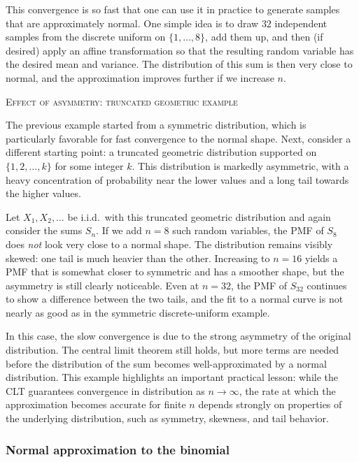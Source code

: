 This convergence is so fast that one can use it in practice to generate samples that are approximately normal.  
One simple idea is to draw \(32\) independent samples from the discrete uniform on \(\{1,\ldots,8\}\), add them up, and then (if desired) apply an affine transformation so that the resulting random variable has the desired mean and variance.  
The distribution of this sum is then very close to normal, and the approximation improves further if we increase \(n\).

\bigskip
\textsc{Effect of asymmetry: truncated geometric example}

The previous example started from a symmetric distribution, which is particularly favorable for fast convergence to the normal shape.  
Next, consider a different starting point: a truncated geometric distribution supported on \(\{1,2,\ldots,k\}\) for some integer \(k\).  
This distribution is markedly asymmetric, with a heavy concentration of probability near the lower values and a long tail towards the higher values.

Let \(X_1, X_2, \ldots\) be i.i.d.\ with this truncated geometric distribution and again consider the sums \(S_n\).  
If we add \(n = 8\) such random variables, the PMF of \(S_8\) does \textit{not} look very close to a normal shape.  
The distribution remains visibly skewed: one tail is much heavier than the other.  
Increasing to \(n = 16\) yields a PMF that is somewhat closer to symmetric and has a smoother shape, but the asymmetry is still clearly noticeable.  
Even at \(n = 32\), the PMF of \(S_{32}\) continues to show a difference between the two tails, and the fit to a normal curve is not nearly as good as in the symmetric discrete-uniform example.

In this case, the slow convergence is due to the strong asymmetry of the original distribution.  
The central limit theorem still holds, but more terms are needed before the distribution of the sum becomes well-approximated by a normal distribution.  
This example highlights an important practical lesson: while the CLT guarantees convergence in distribution as \(n \to \infty\), the rate at which the approximation becomes accurate for finite \(n\) depends strongly on properties of the underlying distribution, such as symmetry, skewness, and tail behavior.

\subsubsection{Normal approximation to the binomial}

